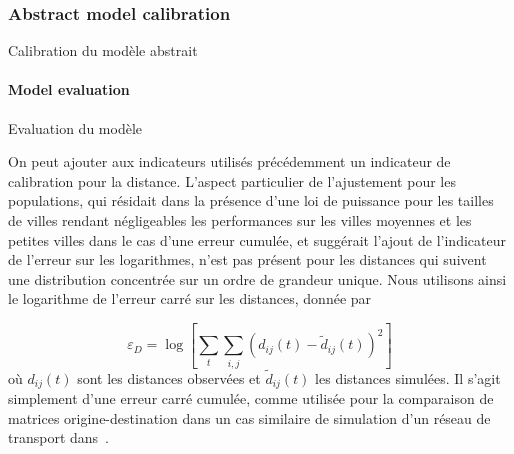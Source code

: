 \subsubsection{Abstract model calibration}{Calibration du modèle abstrait}




\paragraph{Model evaluation}{Evaluation du modèle}

On peut ajouter aux indicateurs utilisés précédemment un indicateur de calibration pour la distance. L'aspect particulier de l'ajustement pour les populations, qui résidait dans la présence d'une loi de puissance pour les tailles de villes rendant négligeables les performances sur les villes moyennes et les petites villes dans le cas d'une erreur cumulée, et suggérait l'ajout de l'indicateur de l'erreur sur les logarithmes, n'est pas présent pour les distances qui suivent une distribution concentrée sur un ordre de grandeur unique. Nous utilisons ainsi le logarithme de l'erreur carré sur les distances, donnée par

\[
\varepsilon_D = \log \left[ \sum_t \sum_{i,j} \left(d_{ij}(t) - \tilde{d}_{ij}(t)\right)^2\right]
\]
où $d_{ij}(t)$ sont les distances observées et $\tilde{d}_{ij}(t)$ les distances simulées. Il s'agit simplement d'une erreur carré cumulée, comme utilisée pour la comparaison de matrices origine-destination dans un cas similaire de simulation d'un réseau de transport dans~\cite{jacobs2016transport}.




